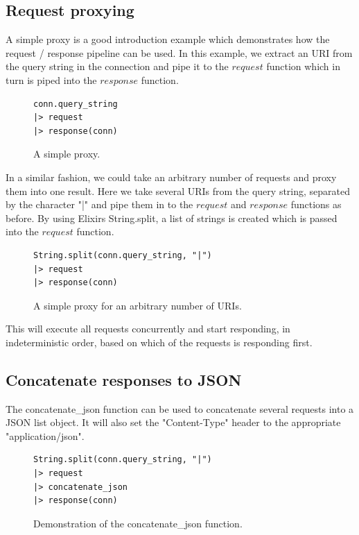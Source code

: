 \documentclass{cslthse-msc}
\begin{document}
\subsection{Request proxying}
A simple proxy is a good introduction example which demonstrates how the request / response pipeline can be used. In this example, we extract an URI from the query string in the connection and pipe it to the $request$ function which in turn is piped into the $response$ function.

\begin{figure}[H]
  \centering
\begin{lstlisting}[breaklines=true,frame=single]
conn.query_string
|> request
|> response(conn)
\end{lstlisting}
  \caption{A simple proxy.}
\end{figure}

In a similar fashion, we could take an arbitrary number of requests and proxy them into one result. Here we take several URIs from the query string, separated by the character "|" and pipe them in to the $request$ and $response$ functions as before. By using Elixirs String.split, a list of strings is created which is passed into the $request$ function.

\begin{figure}[H]
  \centering
\begin{lstlisting}[breaklines=true,frame=single]
String.split(conn.query_string, "|")
|> request
|> response(conn)
\end{lstlisting}
  \caption{A simple proxy for an arbitrary number of URIs.}
\end{figure}

This will execute all requests concurrently and start responding, in indeterministic order, based on which of the requests is responding first.

\subsection{Concatenate responses to JSON}
The concatenate\_json function can be used to concatenate several requests into a JSON list object. It will also set the "Content-Type" header to the appropriate "application/json".

\begin{figure}[H]
  \centering
\begin{lstlisting}[breaklines=true,frame=single]
String.split(conn.query_string, "|")
|> request
|> concatenate_json
|> response(conn)
\end{lstlisting}
  \caption{Demonstration of the concatenate\_json function.}
\end{figure}
\end{document}
